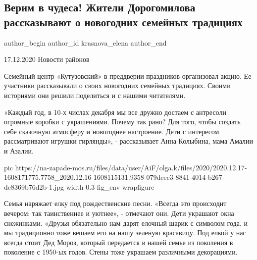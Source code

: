  
 
 
 
 
 
\subsection{Верим в чудеса! Жители Дорогомилова рассказывают о новогодних семейных традициях}
\label{sec:17_12_2020.news.ru.zapad_moskva.krasnova_elena.1.dogomilov_chudesa_deti}
\ifcmt
  author_begin
   author_id krasnova_elena
  author_end
\fi

17.12.2020 Новости районов

Семейный центр «Кутузовский» в преддверии праздников организовал акцию. Ее
участники рассказывали о своих новогодних семейных традициях. Своими историями
они решили поделиться и с нашими читателями.

«Каждый год, в 10-х числах декабря мы все дружно достаем с антресоли огромные
коробки с украшениями. Почему так рано? Для того, чтобы создать себе сказочную
атмосферу и новогоднее настроение. Дети с интересом рассматривают игрушки
гирлянды», - рассказывает Анна Колыбина, мама Амалии и Азалии.

\ifcmt
  pic https://na-zapade-mos.ru/files/data/user/AiF/olga.k/files/2020/2020.12.17-1608171775.7758_2020.12.16-1608115131.9358-079dcec3-8841-4014-b267-de8369b76d2b-1.jpg
  width 0.3
  fig_env wrapfigure
\fi


Семья наряжает елку под рождественские песни. «Всегда это происходит вечером:
так таинственнее и уютнее», - отмечают они. Дети украшают окна снежинками.
«Друзья обязательно нам дарят елочный шарик с символом года, и мы традиционно
тоже вешаем его на нашу зеленую красавицу. Под елкой у нас всегда стоит Дед
Мороз, который передается в нашей семье из поколения в поколение с 1950-ых
годов. Стены тоже украшаем различными декорациями.

